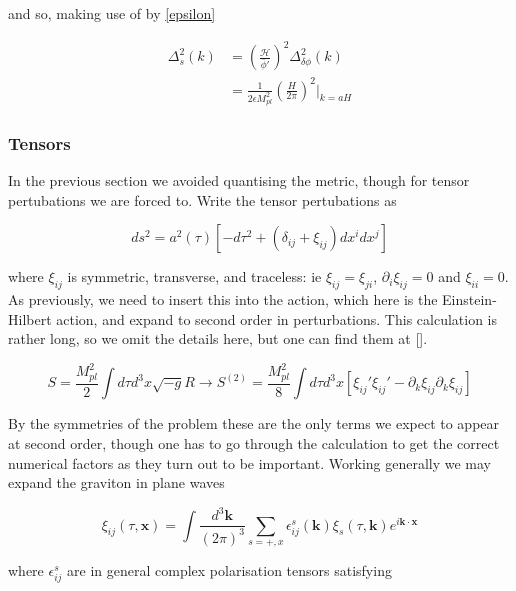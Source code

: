 \documentclass[a4paper,10pt]{article}
\renewcommand{\v}[1]{\mathbf{#1}}
\newcommand{\Mp}{M_{pl}}
\newcommand{\bphi}{\bar{\phi}}
\newcommand{\fint}[1]{\int \frac{d^3 \v{#1}}{(2\pi)^3}}
\begin{document}
and so, making use of by \ref{epsilon}

\begin{equation}\begin{split}
\Delta^2_s(k) &=(\frac{\mathcal{H}}{\bphi'})^2\Delta^2_{\delta\phi}(k)\\
&=\frac{1}{2\epsilon\Mp^2}(\frac{H}{2\pi})^2\rvert_{k=aH}
\end{split}\end{equation}


\subsubsection{Tensors}

In the previous section we avoided quantising the metric, though for tensor pertubations we are forced to. Write the tensor pertubations as 

\begin{equation}
ds^2 = a^2(\tau)[-d\tau^2 + (\delta_{ij}+\xi_{ij})dx^idx^j]
\end{equation}

where $\xi_{ij}$ is symmetric, transverse, and traceless: ie $\xi_{ij}=\xi_{ji}$, $\partial_i\xi_{ij}=0$ and $\xi_{ii}=0$.\\

As previously, we need to insert this into the action, which here is the Einstein-Hilbert action, and expand to second order in perturbations. This calculation is rather long, so we omit the details here, but one can find them at []. 

\begin{equation}
S=\frac{\Mp^2}{2} \int d\tau d^3x \sqrt{-g}R \rightarrow S^{(2)} = \frac{\Mp^2}{8}\int d\tau d^3x [\xi_{ij}'\xi_{ij}'-\partial_k\xi_{ij}\partial_k\xi_{ij}]
\end{equation}

By the symmetries of the problem these are the only terms we expect to appear at second order, though one has to go through the calculation to get the correct numerical factors as they turn out to be important. Working generally we may expand the graviton in plane waves 

\begin{equation}
\xi_{ij}(\tau, \v{x}) = \fint{k} \sum_{s=+,x} \epsilon_{ij}^s(\v{k})\xi_s(\tau,\v{k})e^{i\v{k}\cdot\v{x}}
\end{equation}

where $\epsilon_{ij}^s$ are in general complex polarisation tensors satisfying
\end{document}
